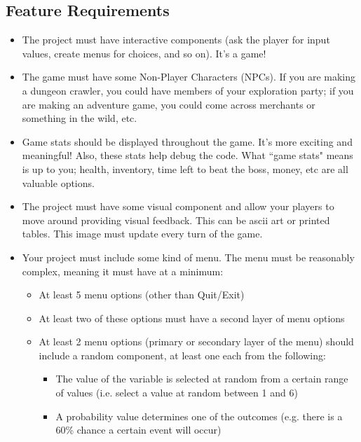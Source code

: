 \subsection{Feature Requirements}
\begin{itemize}
    \item The project must have interactive components (ask the player for input values, create menus for choices, and so on). It’s a game! 
    \item The game must have some Non-Player Characters (NPCs). If you are making a dungeon crawler, you could have members of your exploration party; if you are making an adventure game, you could come across merchants or something in the wild, etc. 
    \item Game stats should be displayed throughout the game. It’s more exciting and meaningful! Also, these stats help debug the code. What ``game stats" means is up to you; health, inventory, time left to beat the boss, money, etc are all valuable options.
    \item The project must have some visual component and allow your players to move around providing visual feedback. This can be ascii art or printed tables. This image must update every turn of the game.
    \item Your project must include some kind of menu. The menu must be reasonably complex, meaning it must have at a minimum:
        \begin{itemize}
            \item At least 5 menu options (other than Quit/Exit)
            \item At least two of these options must have a second layer of menu options
            \item At least 2 menu options (primary or secondary layer of the menu) should include a random component, at least one each from the following:
                \begin{itemize}
                    \item The value of the variable is selected at random from a certain range of values (i.e. select a value at random between 1 and 6)
                    \item A probability value determines one of the outcomes (e.g. there is a 60\% chance a certain event will occur)
                \end{itemize}
        \end{itemize}    

\end{itemize}

